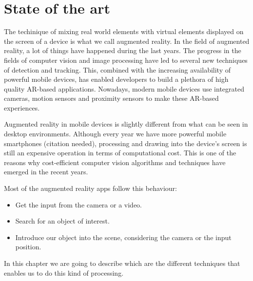 \chapter{State of the art}
\label{chap:sota}
The techinique of
mixing real world elements with virtual elements displayed on the screen of a
device is what we call augmented reality. In the field of augmented reality, a
lot of things have happened during the last years. The progress in the fields
of computer vision and image processing have led to several new techniques of
detection and tracking. This, combined with the increasing availability of
powerful mobile devices, has enabled developers to build a plethora of high
quality AR-based applications. Nowadays, modern mobile devices use integrated
cameras, motion sensors and proximity sensors to make these AR-based experiences. 

Augmented reality in mobile devices is slightly different from what can be seen in
desktop environments. Although every year we have more powerful mobile smartphones
(citation needed), processing and drawing into the device's screen is still an
expensive operation in terms of computational cost. This is one of the reasons why
cost-efficient computer vision algorithms and techniques have emerged in the recent
years. 

Most of the augmented reality apps follow this behaviour:
\begin{itemize}
\item Get the input from the camera or a video.
\item Search for an object of interest.
\item Introduce our object into the scene, considering the camera or the input position.
\end{itemize}

In this chapter we are going to describe which are the different techniques
that enables us to do this kind of processing.



